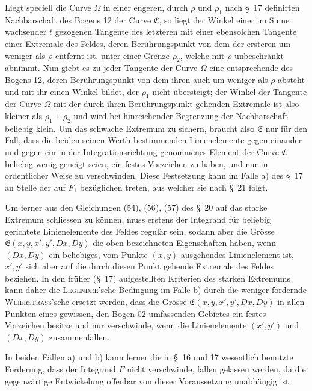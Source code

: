 \documentclass[11pt,a4paper,leqno]{article}
\begin{document}
Liegt speciell die Curve $\Omega$ in einer engeren, durch $\rho$ und $\rho_1$ nach \S~17 definirten Nachbarschaft des Bogens 12 der Curve $\mathfrak{C}$, so liegt der Winkel einer im Sinne wachsender $t$ gezogenen Tangente des letzteren mit einer ebensolchen Tangente einer Extremale des Feldes, deren Berührungspunkt von dem der ersteren um weniger als $\rho$ entfernt ist, unter einer Grenze $\rho_2$, welche mit $\rho$ unbeschränkt abnimmt. Nun giebt es zu jeder Tangente der Curve $\Omega$ eine entsprechende des Bogens 12, deren Berührungspunkt von dem ihren auch um weniger als $\rho$ absteht und mit ihr einen Winkel bildet, der $\rho_1$ nicht übersteigt; der Winkel der Tangente der Curve $\Omega$ mit der durch ihren Berührungspunkt gehenden Extremale ist also kleiner als $\rho_1+\rho_2$ und wird bei hinreichender Begrenzung der Nachbarschaft beliebig klein. Um das schwache Extremum zu sichern, braucht also $\mathfrak{E}$ nur für den Fall, dass die beiden seinen Werth bestimmenden Linienelemente gegen einander und gegen ein in der Integrationsrichtung genommenes Element der Curve $\mathfrak{C}$ beliebig wenig geneigt seien, ein festes Vorzeichen zu haben, und nur in ordentlicher Weise zu verschwinden. Diese Festsetzung kann im Falle a) des \S~17 an Stelle der auf $F_1$ bezüglichen treten, aus welcher sie nach \S~21 folgt.

Um ferner aus den Gleichungen (54), (56), (57) des \S~20 auf das starke Extremum schliessen zu können, muss erstens der Integrand für beliebig gerichtete Linienelemente des Feldes regulär sein, sodann aber die Grösse $\mathfrak{E}(x,y,x',y',D x,D y)$ die oben bezeichneten Eigenschaften haben, wenn $(D x,D y)$ ein beliebiges, vom Punkte $(x,y)$ ausgehendes Linienelement ist, $x',y'$ sich aber auf die durch diesen Punkt gehende Extremale des Feldes beziehen. In den früher (\S~17) aufgestellten Kriterien des starken Extremums kann daher die \textsc{Legendre}'sche Bedingung im Falle b) durch die weniger fordernde \textsc{Weierstrass}'sche ersetzt werden, dass die Grösse $\mathfrak{E}(x,y,x',y',D x,D y)$ in allen Punkten eines gewissen, den Bogen 02 umfassenden Gebietes ein festes Vorzeichen besitze und nur verschwinde, wenn die Linienelemente $(x',y')$ und $(D x,D y)$ zusammenfallen.

In beiden Fällen a) und b) kann ferner die in \S~16 und 17
wesentlich benutzte Forderung, dass der Integrand $F$ nicht verschwinde, fallen gelassen werden, da die gegenwärtige Entwickelung offenbar von dieser Voraussetzung unabhängig ist.
\end{document}
